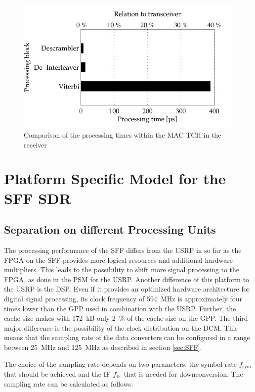 \begin{figure}[!!h]
	\centering
		\includegraphics{../kapitel05/figures/bench_gpp_rx_tch.pdf}
	\caption{Comparison of the processing times within the MAC TCH in the receiver}
	\label{fig:bench_gpp_rx_tch}
\end{figure}


\section{Platform Specific Model for the SFF SDR}

\subsection{Separation on different Processing Units}
The processing performance of the SFF differs from the USRP in so far as the FPGA on the SFF provides more logical resources and additional hardware multipliers. This leads to the possibility to shift more signal processing to the FPGA, as done in the \ac{PSM} for the USRP. Another difference of this platform to the USRP is the DSP. Even if it provides an optimized hardware architecture for digital signal processing, its clock frequency of \SI{594}{MHz} is approximately four times lower than the \ac{GPP} used in combination with the \ac{USRP}. Further, the cache size makes with \SI{172}{kB} only \SI{2}{\%} of the cache size on the GPP. The third major difference is the possibility of the clock distribution on the \ac{DCM}. This means that the sampling rate of the data converters can be configured in a range between \SI{25}{MHz} and \SI{125}{MHz} as described in section \ref{sec:SFF}.

The choice of the sampling rate depends on two parameters: the symbol rate $f_\text{sym}$ that should be achieved and the \ac{IF} $f_\text{IF}$ that is needed for downconversion. The sampling rate can be calculated as follows:

